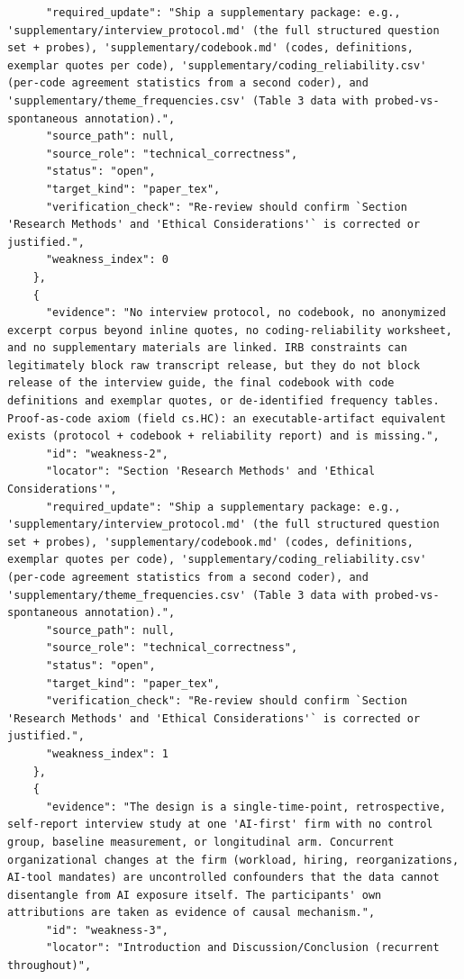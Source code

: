 \documentclass[11pt]{article}
\begin{document}
\begin{verbatim}
      "required_update": "Ship a supplementary package: e.g., 'supplementary/interview_protocol.md' (the full structured question set + probes), 'supplementary/codebook.md' (codes, definitions, exemplar quotes per code), 'supplementary/coding_reliability.csv' (per-code agreement statistics from a second coder), and 'supplementary/theme_frequencies.csv' (Table 3 data with probed-vs-spontaneous annotation).",
      "source_path": null,
      "source_role": "technical_correctness",
      "status": "open",
      "target_kind": "paper_tex",
      "verification_check": "Re-review should confirm `Section 'Research Methods' and 'Ethical Considerations'` is corrected or justified.",
      "weakness_index": 0
    },
    {
      "evidence": "No interview protocol, no codebook, no anonymized excerpt corpus beyond inline quotes, no coding-reliability worksheet, and no supplementary materials are linked. IRB constraints can legitimately block raw transcript release, but they do not block release of the interview guide, the final codebook with code definitions and exemplar quotes, or de-identified frequency tables. Proof-as-code axiom (field cs.HC): an executable-artifact equivalent exists (protocol + codebook + reliability report) and is missing.",
      "id": "weakness-2",
      "locator": "Section 'Research Methods' and 'Ethical Considerations'",
      "required_update": "Ship a supplementary package: e.g., 'supplementary/interview_protocol.md' (the full structured question set + probes), 'supplementary/codebook.md' (codes, definitions, exemplar quotes per code), 'supplementary/coding_reliability.csv' (per-code agreement statistics from a second coder), and 'supplementary/theme_frequencies.csv' (Table 3 data with probed-vs-spontaneous annotation).",
      "source_path": null,
      "source_role": "technical_correctness",
      "status": "open",
      "target_kind": "paper_tex",
      "verification_check": "Re-review should confirm `Section 'Research Methods' and 'Ethical Considerations'` is corrected or justified.",
      "weakness_index": 1
    },
    {
      "evidence": "The design is a single-time-point, retrospective, self-report interview study at one 'AI-first' firm with no control group, baseline measurement, or longitudinal arm. Concurrent organizational changes at the firm (workload, hiring, reorganizations, AI-tool mandates) are uncontrolled confounders that the data cannot disentangle from AI exposure itself. The participants' own attributions are taken as evidence of causal mechanism.",
      "id": "weakness-3",
      "locator": "Introduction and Discussion/Conclusion (recurrent throughout)",

\end{verbatim}
\end{document}
